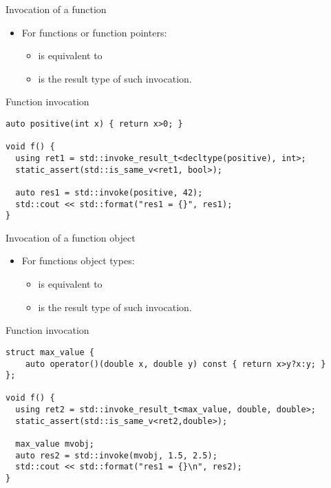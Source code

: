 \begin{frame}[t,fragile]{Invocation of a function}
\begin{itemize}
  \item For functions or function pointers:
    \begin{itemize}
      \item {}
            is equivalent to 
      \item {}
            is the result type of such invocation.
    \end{itemize}
\end{itemize}
\begin{block}{Function invocation}
\begin{lstlisting}
auto positive(int x) { return x>0; }

void f() {
  using ret1 = std::invoke_result_t<decltype(positive), int>;
  static_assert(std::is_same_v<ret1, bool>);

  auto res1 = std::invoke(positive, 42);
  std::cout << std::format("res1 = {}", res1);
}
\end{lstlisting}
\end{block}
\end{frame}

\begin{frame}[t,fragile]{Invocation of a function object}
\begin{itemize}
  \item For functions object types:
    \begin{itemize}
      \item {}
            is equivalent to 
      \item {}
            is the result type of such invocation.
    \end{itemize}
\end{itemize}
\begin{block}{Function invocation}
\begin{lstlisting}[basicstyle=\mode<presentation>{\tiny}]
struct max_value {
    auto operator()(double x, double y) const { return x>y?x:y; }
};

void f() {
  using ret2 = std::invoke_result_t<max_value, double, double>;
  static_assert(std::is_same_v<ret2,double>);

  max_value mvobj;
  auto res2 = std::invoke(mvobj, 1.5, 2.5);
  std::cout << std::format("res1 = {}\n", res2);
}
\end{lstlisting}
\end{block}
\end{frame}

